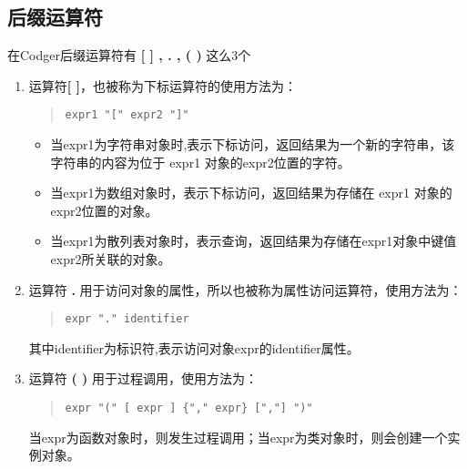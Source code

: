 \subsection{后缀运算符}
在Codger后缀运算符有\textbf{ [ ] , . , ( ) } 这么3个
\begin{enumerate}
\item 运算符\textbf{[ ]}，也被称为下标运算符的使用方法为：
\begin{quote}
\begin{verbatim}
expr1 "[" expr2 "]"
\end{verbatim}
\end{quote}
\begin{itemize}
\item 当expr1为字符串对象时,表示下标访问，返回结果为一个新的字符串，该字符串的内容为位于 expr1 对象的expr2位置的字符。
\item 当expr1为数组对象时，表示下标访问，返回结果为存储在 expr1 对象的expr2位置的对象。
\item 当expr1为散列表对象时，表示查询，返回结果为存储在expr1对象中键值expr2所关联的对象。
\end{itemize}
\item 运算符 \textbf{ . } 用于访问对象的属性，所以也被称为属性访问运算符，使用方法为：
\begin{quote}
\begin{verbatim}
expr "." identifier 
\end{verbatim}
\end{quote}
其中identifier为标识符,表示访问对象expr的identifier属性。
\item 运算符 \textbf{ ( ) } 用于过程调用，使用方法为：
\begin{quote}
\begin{verbatim}
expr "(" [ expr ] {"," expr} [","] ")"
\end{verbatim}
\end{quote}
当expr为函数对象时，则发生过程调用；当expr为类对象时，则会创建一个实例对象。
\end{enumerate}
